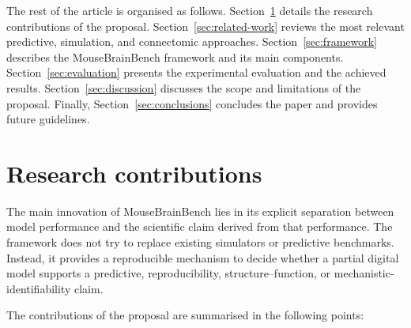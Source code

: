 \documentclass[a4paper,fleqn]{cas-sc}
\begin{document}
The rest of the article is organised as follows. Section~\ref{sec:contributions}
details the research contributions of the proposal. Section~\ref{sec:related-work}
reviews the most relevant predictive, simulation, and connectomic approaches.
Section~\ref{sec:framework} describes the MouseBrainBench framework and its
main components. Section~\ref{sec:evaluation} presents the experimental
evaluation and the achieved results. Section~\ref{sec:discussion} discusses the
scope and limitations of the proposal. Finally, Section~\ref{sec:conclusions}
concludes the paper and provides future guidelines.

\section{Research contributions}
\label{sec:contributions}

The main innovation of MouseBrainBench lies in its explicit separation between
model performance and the scientific claim derived from that performance. The
framework does not try to replace existing simulators or predictive benchmarks.
Instead, it provides a reproducible mechanism to decide whether a partial digital
model supports a predictive, reproducibility, structure--function, or
mechanistic-identifiability claim.

The contributions of the proposal are summarised in the following points:
\end{document}
